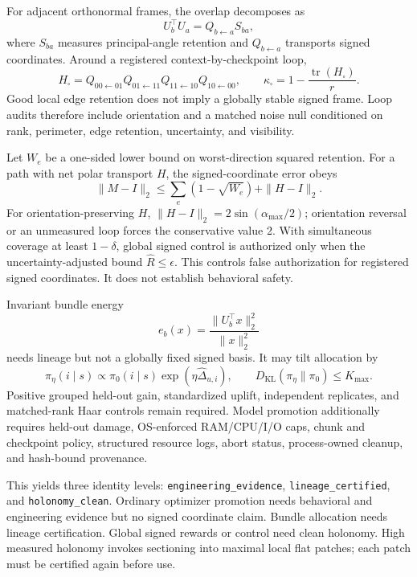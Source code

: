 \documentclass[11pt]{article}
\begin{document}
For adjacent orthonormal frames, the overlap decomposes as
\[
U_b^\top U_a=Q_{b\leftarrow a}S_{ba},
\]
where $S_{ba}$ measures principal-angle retention and $Q_{b\leftarrow a}$ transports signed coordinates. Around
a registered context-by-checkpoint loop,
\[
H_{\square}=Q_{00\leftarrow01}Q_{01\leftarrow11}
Q_{11\leftarrow10}Q_{10\leftarrow00},\qquad
\kappa_{\square}=1-\frac{\operatorname{tr}(H_{\square})}{r}.
\]
Good local edge retention does not imply a globally stable signed frame. Loop audits therefore include
orientation and a matched noise null conditioned on rank, perimeter, edge retention, uncertainty, and visibility.

Let $W_e$ be a one-sided lower bound on worst-direction squared retention. For a path with net polar transport
$H$, the signed-coordinate error obeys
\[
\|M-I\|_2\leq\sum_e(1-\sqrt{W_e})+\|H-I\|_2.
\]
For orientation-preserving $H$, $\|H-I\|_2=2\sin(\alpha_{\max}/2)$; orientation reversal or an unmeasured loop
forces the conservative value 2. With simultaneous coverage at least $1-\delta$, global signed control is
authorized only when the uncertainty-adjusted bound $\widehat R\leq\epsilon$. This controls false authorization
for registered signed coordinates. It does not establish behavioral safety.

Invariant bundle energy
\[
e_b(x)=\frac{\|U_b^\top x\|_2^2}{\|x\|_2^2}
\]
needs lineage but not a globally fixed signed basis. It may tilt allocation by
\[
\pi_\eta(i\mid s)\propto\pi_0(i\mid s)\exp(\eta\widehat\Delta_{u,i}),
\qquad D_{\mathrm{KL}}(\pi_\eta\|\pi_0)\leq K_{\max}.
\]
Positive grouped held-out gain, standardized uplift, independent replicates, and matched-rank Haar controls remain
required. Model promotion additionally requires held-out damage, OS-enforced RAM/CPU/I/O caps, chunk and
checkpoint policy, structured resource logs, abort status, process-owned cleanup, and hash-bound provenance.

This yields three identity levels: \texttt{engineering\_evidence}, \texttt{lineage\_certified}, and
\texttt{holonomy\_clean}. Ordinary optimizer promotion needs behavioral and engineering evidence but no signed
coordinate claim. Bundle allocation needs lineage certification. Global signed rewards or control need clean
holonomy. High measured holonomy invokes sectioning into maximal local flat patches; each patch must be certified
again before use.
\end{document}
